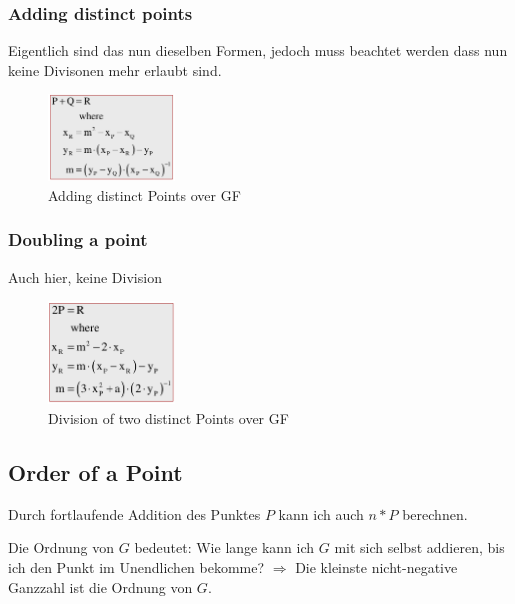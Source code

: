 \hypertarget{adding-distinct-points}{%
\subsubsection{Adding distinct points}\label{adding-distinct-points}}

Eigentlich sind das nun dieselben Formen, jedoch muss beachtet werden
dass nun keine Divisonen mehr erlaubt sind.

\begin{figure}[H]
\centering
\includegraphics[width=0.3\textwidth]{figures/addingDistinctPointsoverGF.png}
\caption{Adding distinct Points over GF}
\end{figure}

\clearpage
\hypertarget{doubling-a-point}{%
\subsubsection{Doubling a point}\label{doubling-a-point}}

Auch hier, keine Division
\begin{figure}[H]
\centering
\includegraphics[width=0.3\textwidth]{figures/doublingPointOverGf.png}
\caption{Division of two distinct Points over GF}
\end{figure}

\hypertarget{order-of-a-point}{%
\subsection{Order of a Point}\label{order-of-a-point}}

Durch fortlaufende Addition des Punktes $P$ kann ich auch $n*P$ berechnen.

Die Ordnung von $G$ bedeutet: Wie lange kann ich $G$ mit sich selbst
addieren, bis ich den Punkt im Unendlichen bekomme? $\Rightarrow$ Die kleinste
nicht-negative Ganzzahl ist die Ordnung von $G$.

